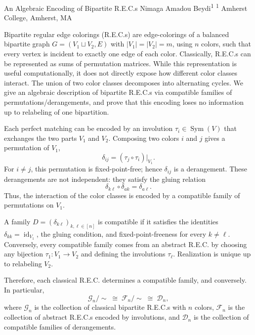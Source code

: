 \makeabstractSHORT
{ %
An Algebraic Encoding of Bipartite R.E.C.s
}
{ %
Nimaga Amadou Beydi\textsuperscript{1}
}
{ %
\textsuperscript{1} Amherst College, Amherst, MA
}
{ %
Bipartite regular edge colorings (R.E.C.s) are edge-colorings of a balanced bipartite graph \(G=(V_1\sqcup V_2,E)\) with \(|V_1|=|V_2|=m\), using \(n\) colors, such that every vertex is incident to exactly one edge of each color. Classically, R.E.C.s can be represented as sums of permutation matrices. While this representation is useful computationally, it does not directly expose how different color classes interact. The union of two color classes decomposes into alternating cycles. We give an algebraic description of bipartite R.E.C.s via compatible families of permutations/derangements, and prove that this encoding loses no information up to relabeling of one bipartition.

Each perfect matching can be encoded by an involution \(\tau_i\in\operatorname{Sym}(V)\) that exchanges the two parts \(V_1\) and \(V_2\). Composing two colors \(i\) and \(j\) gives a permutation of \(V_1\),
\[
\delta_{ij}=(\tau_j\circ\tau_i)|_{V_1}.
\]
For \(i\ne j\), this permutation is fixed-point-free; hence \(\delta_{ij}\) is a derangement. These derangements are not independent: they satisfy the gluing relation
\[
\delta_{k\ell}\circ\delta_{ak}=\delta_{a\ell}.
\]
Thus, the interaction of the color classes is encoded by a compatible family of permutations on \(V_1\).

A family \(D=(\delta_{k\ell})_{k,\ell\in[n]}\) is compatible if it satisfies the identities \(\delta_{kk}=\operatorname{id}_{V_1}\), the gluing condition, and fixed-point-freeness for every \(k\ne\ell\). Conversely, every compatible family comes from an abstract R.E.C. by choosing any bijection \(\tau_1:V_1\to V_2\) and defining the involutions \(\tau_\ell\). Realization is unique up to relabeling \(V_2\).

Therefore, each classical R.E.C. determines a compatible family, and conversely. In particular,
\[
\mathcal G_n/\sim\;\cong\;\mathcal F_n/\sim\;\cong\;\mathcal D_n,
\]
where \(\mathcal G_n\) is the collection of classical bipartite R.E.C.s with \(n\) colors, \(\mathcal F_n\) is the collection of abstract R.E.C.s encoded by involutions, and \(\mathcal D_n\) is the collection of compatible families of derangements.
}
 \newpage